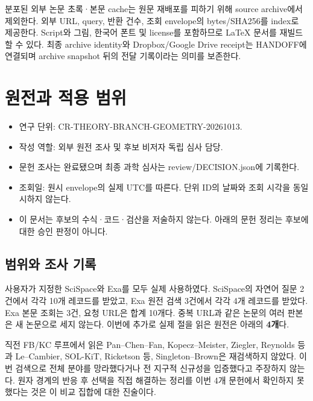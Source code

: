 분포된 외부 논문 초록·본문 cache는 원문 재배포를 피하기 위해 source archive에서 제외한다. 외부 URL, query, 반환 건수, 조회 envelope의 bytes/SHA256를 index로 제공한다. Script와 그림, 한국어 폰트 및 license를 포함하므로 LaTeX 문서를 재빌드할 수 있다. 최종 archive identity와 Dropbox/Google Drive receipt는 HANDOFF에 연결되며 archive snapshot 뒤의 전달 기록이라는 의미를 보존한다.

\clearpage

\hypertarget{uxc6d0uxc804uxacfc-uxc801uxc6a9-uxbc94uxc704}{%
\section{원전과 적용 범위}\label{uxc6d0uxc804uxacfc-uxc801uxc6a9-uxbc94uxc704}}

\begingroup
\small

\begin{itemize}
\tightlist
\item
  연구 단위: CR-THEORY-BRANCH-GEOMETRY-20261013.
\item
  작성 역할: 외부 원전 조사 및 후보 비저자 독립 심사 담당.
\item
  문헌 조사는 완료됐으며 최종 과학 심사는 review/DECISION.json에 기록한다.
\item
  조회일: 원시 envelope의 실제 UTC를 따른다. 단위 ID의 날짜와 조회 시각을 동일시하지 않는다.
\item
  이 문서는 후보의 수식·코드·검산을 저술하지 않는다. 아래의 문헌 정리는 후보에 대한 승인 판정이 아니다.
\end{itemize}

\hypertarget{uxbc94uxc704uxc640-uxc870uxc0ac-uxae30uxb85d}{%
\subsection{범위와 조사 기록}\label{uxbc94uxc704uxc640-uxc870uxc0ac-uxae30uxb85d}}

사용자가 지정한 SciSpace와 Exa를 모두 실제 사용하였다. SciSpace의 자연어 질문 2건에서 각각 10개 레코드를 받았고, Exa 원전 검색 3건에서 각각 4개 레코드를 받았다. Exa 본문 조회는 3건, 요청 URL은 합계 10개다. 중복 URL과 같은 논문의 여러 판본은 새 논문으로 세지 않는다. 이번에 추가로 실제 절을 읽은 원전은 아래의 \textbf{4개}다.

직전 FB/KC 루프에서 읽은 Pan--Chen--Fan, Kopecz--Meister, Ziegler, Reynolds 등과 Le--Cambier, SOL-KiT, Ricketson 등, Singleton--Brown은 재검색하지 않았다. 이번 검색으로 전체 분야를 망라했다거나 전 지구적 신규성을 입증했다고 주장하지 않는다. 원자 경계의 반응 후 선택을 직접 해결하는 정리를 이번 4개 문헌에서 확인하지 못했다는 것은 이 비교 집합에 대한 진술이다.

